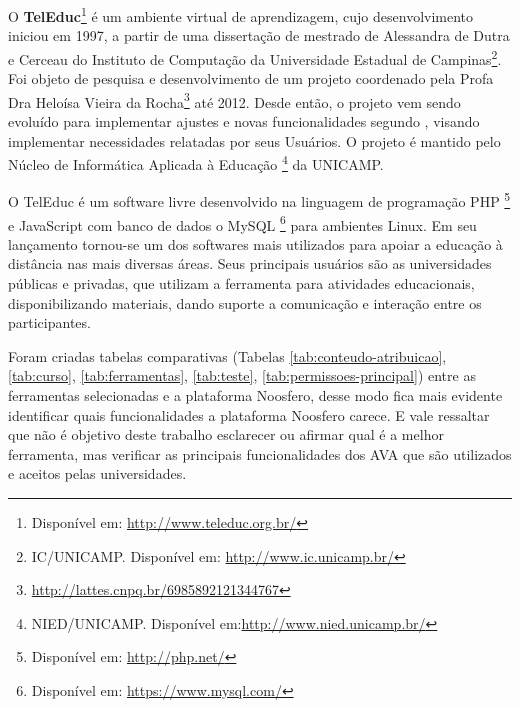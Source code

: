 O \textbf{TelEduc}\footnote{Disponível em: \url{http://www.teleduc.org.br/}} é um ambiente virtual de aprendizagem, cujo desenvolvimento iniciou em 1997, a partir de uma dissertação de mestrado de Alessandra de Dutra e Cerceau do Instituto de Computação da Universidade Estadual de Campinas\footnote{IC/UNICAMP. Disponível em: \url{http://www.ic.unicamp.br/}}. Foi objeto de pesquisa e desenvolvimento de um projeto coordenado pela Profa Dra Heloísa Vieira da Rocha\footnote{\url{http://lattes.cnpq.br/6985892121344767}} até 2012. Desde então, o projeto vem sendo evoluído para implementar ajustes e novas funcionalidades segundo \cite{rocha2002ambiente}, visando implementar necessidades relatadas por seus Usuários. O projeto é mantido pelo Núcleo de Informática Aplicada à Educação \footnote{NIED/UNICAMP. Disponível em:\url{http://www.nied.unicamp.br/}} da UNICAMP.

O TelEduc é um software livre desenvolvido na linguagem de programação PHP \footnote{Disponível em: \url{http://php.net/}} e JavaScript com banco de dados o MySQL \footnote{Disponível em: \url{https://www.mysql.com/}} para ambientes Linux. Em seu lançamento tornou-se um dos softwares mais utilizados para apoiar a educação à distância nas mais diversas áreas. Seus principais usuários são as universidades públicas e privadas, que utilizam a ferramenta para atividades educacionais, disponibilizando materiais, dando suporte a comunicação e interação entre os participantes.

Foram criadas tabelas comparativas (Tabelas \ref{tab:conteudo-atribuicao}, \ref{tab:curso}, \ref{tab:ferramentas}, \ref{tab:teste}, \ref{tab:permissoes-principal}) entre as ferramentas selecionadas e a plataforma Noosfero, desse modo fica mais evidente identificar quais funcionalidades a plataforma Noosfero carece. E vale ressaltar que não é objetivo deste trabalho esclarecer ou afirmar qual é a melhor ferramenta, mas verificar as principais funcionalidades dos AVA que são utilizados e aceitos pelas universidades.

